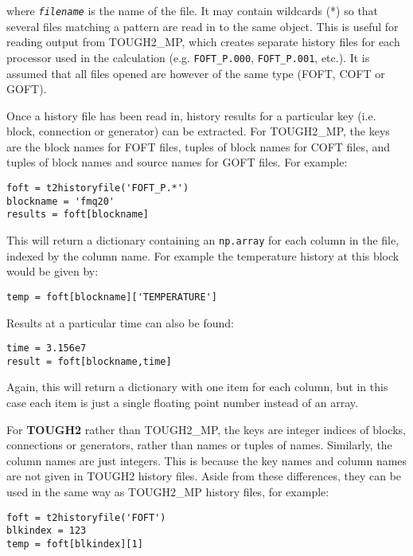 where \texttt{\emph{filename}} is the name of the file.  It may contain wildcards (*) so that several files matching a pattern are read in to the same object.  This is useful for reading output from TOUGH2\_MP, which creates separate history files for each processor used in the calculation (e.g. \texttt{FOFT\_P.000}, \texttt{FOFT\_P.001}, etc.).  It is assumed that all files opened are however of the same type (FOFT, COFT or GOFT).

Once a history file has been read in, history results for a particular key (i.e. block, connection or generator) can be extracted.  For TOUGH2\_MP, the keys are the block names for FOFT files, tuples of block names for COFT files, and tuples of block names and source names for GOFT files.  For example:

\begin{verbatim}
foft = t2historyfile('FOFT_P.*')
blockname = 'fmq20'
results = foft[blockname]
\end{verbatim}

This will return a dictionary containing an \texttt{np.array} for each column in the file, indexed by the column name.  For example the temperature history at this block would be given by:

\begin{verbatim}
temp = foft[blockname]['TEMPERATURE']
\end{verbatim}

Results at a particular time can also be found:

\begin{verbatim}
time = 3.156e7
result = foft[blockname,time]
\end{verbatim}

Again, this will return a dictionary with one item for each column, but in this case each item is just a single floating point number instead of an array.

For \textbf{TOUGH2} rather than TOUGH2\_MP, the keys are integer indices of blocks, connections or generators, rather than names or tuples of names.  Similarly, the column names are just integers.  This is because the key names and column names are not given in TOUGH2 history files.  Aside from these differences, they can be used in the same way as TOUGH2\_MP history files, for example:

\begin{verbatim}
foft = t2historyfile('FOFT')
blkindex = 123
temp = foft[blkindex][1]
\end{verbatim}

